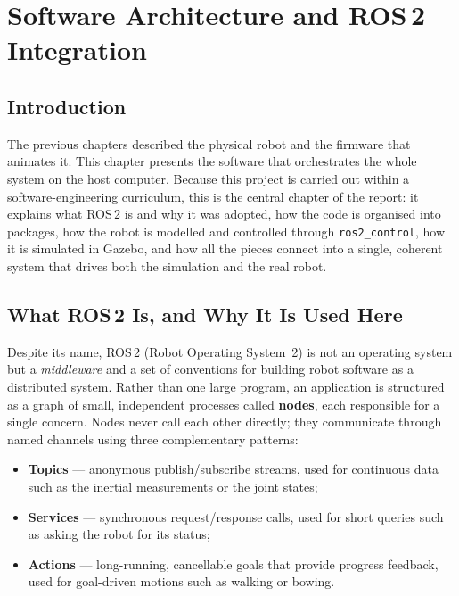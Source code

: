 \chapter{Software Architecture and ROS\,2 Integration}
\label{chap:software}

\section{Introduction}
The previous chapters described the physical robot and the firmware that
animates it. This chapter presents the software that orchestrates the
whole system on the host computer. Because this project is carried out
within a software-engineering curriculum, this is the central chapter of
the report: it explains what ROS\,2 is and why it was adopted, how the
code is organised into packages, how the robot is modelled and
controlled through \texttt{ros2\_control}, how it is simulated in Gazebo,
and how all the pieces connect into a single, coherent system that drives
both the simulation and the real robot.

\section{What ROS\,2 Is, and Why It Is Used Here}
\label{sec:why-ros2}
Despite its name, ROS\,2 (Robot Operating System~2) is not an operating
system but a \emph{middleware} and a set of conventions for building robot
software as a distributed system. Rather than one large program, an
application is structured as a graph of small, independent processes
called \textbf{nodes}, each responsible for a single concern. Nodes never
call each other directly; they communicate through named channels using
three complementary patterns:

\begin{itemize}[itemsep=2pt,topsep=4pt]
  \item \textbf{Topics} --- anonymous publish/subscribe streams, used for
        continuous data such as the inertial measurements or the joint
        states;
  \item \textbf{Services} --- synchronous request/response calls, used for
        short queries such as asking the robot for its status;
  \item \textbf{Actions} --- long-running, cancellable goals that provide
        progress feedback, used for goal-driven motions such as walking or
        bowing.
\end{itemize}

